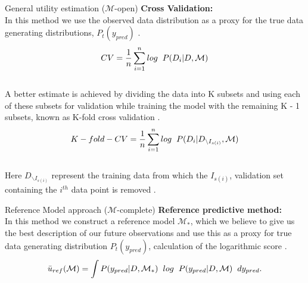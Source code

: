 \documentclass[t, aspectratio=169]{beamer}
\begin{document}
 \begin{frame}{General utility estimation (\(\mathcal{M}\)-open)
}
 \vspace{0.6cm}
 \textbf{Cross Validation:}\\
\vspace{0.5cm}
In this method we use the observed data distribution as a proxy for the true data generating distributions,\hspace{0.2cm} \(P_t(y_{pred})\)    \cite{Vehtari}.
\[CV = \frac{1}{n}  \sum_{i=1}^{n}log\hspace{0.2cm}  P(D_i|D,\mathcal{M} ) \]\\
 \vspace{0.3cm}
A better estimate is achieved by dividing the data into K subsets and using each of these subsets for validation while training the model with the remaining K - 1 subsets, known as K-fold cross validation    \cite{Vehtari}.
\[K-fold-CV = \frac{1}{n}  \sum_{i=1}^{n}log\hspace{0.2cm}  P(D_i|D_{ \backslash I_{s(i)} },\mathcal{M} )\]\\
Here \(D_{ \backslash I_{s(i)} }\) represent the training data from which the \(I_{s(i)}\), validation set containing the \(i^{th}\) data point is removed . 
 \end{frame} 
 

 
 \begin{frame}{Reference Model approach (\(\mathcal{M}\)-complete)
}
 \vspace{1cm}
 \textbf{Reference predictive method:}\\
\vspace{0.8cm}
In this method we construct a reference model \(\mathcal{M}_*\), which we believe to give us the best description of our future observations and use this as a proxy for true data generating distribution \(P_t(y_{pred})\), calculation of the logarithmic score \cite{Vehtari}. 
\\

\[\bar{u}_{ref}(\mathcal{M}) =  \int P(y_{pred}|D,\mathcal{M}_* ) \hspace{0.2cm} log\hspace{0.2cm}  P(y_{pred}|D,\mathcal{M} ) \hspace{0.2cm} dy_{pred}.\]\\


 \end{frame} 
 
\end{document}
